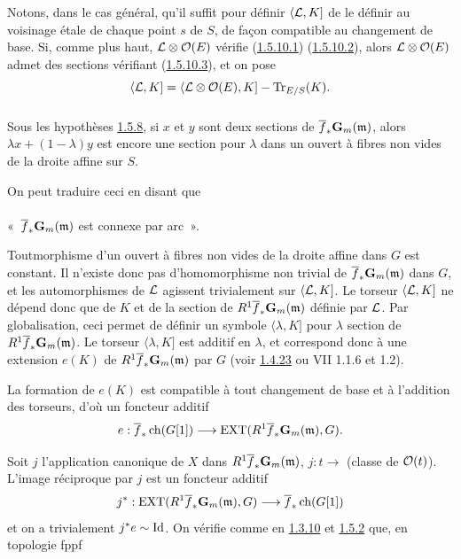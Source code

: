 \documentclass[10pt]{../fichiers-configuration-latex/smfart}
\begin{document}
Notons, dans le cas général, qu'il suffit pour définir
$\langle {\mathcal L},K]$ de le définir au voisinage étale de chaque point $s$
de $S$, de façon compatible au changement de base. Si, comme plus
haut, ${\mathcal L}\otimes {\mathcal O}(E)$ vérifie (\hyperref[XVIII.par1.5.10.1]{1.5.10.1})
(\hyperref[XVIII.par1.5.10.2]{1.5.10.2}), 
alors ${\mathcal L}\otimes {\mathcal O}(E)$ admet des sections vérifiant
(\hyperref[XVIII.par1.5.10.3]{1.5.10.3}), et on pose
$$
\langle {\mathcal L},K]=\langle {\mathcal L}\otimes {\mathcal O}(E), K]-\operatorname{Tr}_{E/S}(K){}.
$$

\subsubsection{}
Sous les hypothèses \hyperref[XVIII.subsubsec1.5.8]{1.5.8}, si $x$ et $y$ sont
deux sections de 
$\overline{f}_{\ast}\mathbf{G}_{m}(\mathfrak{m})$, alors $\lambda x+(1-\lambda)y$ est
encore une section pour $\lambda$ dans un ouvert à fibres non vides de
la droite affine sur $S$.

On peut traduire ceci en disant que 

\paragraph{}
« $\overline{f}_{\ast}\mathbf{G}_{m}(\mathfrak{m})$ est connexe par arc ».

Tout\pageoriginale morphisme d'un ouvert à fibres non vides de la
droite affine dans $G$ est constant. Il n'existe donc pas
d'homomorphisme non trivial de $\overline{f}_{\ast}\mathbf{G}_{m}(\mathfrak{m})$ dans
$G$, et les automorphismes de ${\mathcal L}$ agissent trivialement sur
$\langle {\mathcal L},K]$. Le torseur $\langle {\mathcal L},K]$ ne dépend donc que de
$K$ et de la section de $R^{1}\overline{f}_{\ast}\mathbf{G}_{m}(\mathfrak{m})$ définie
par ${\mathcal L}$. Par globalisation, ceci permet de définir un
symbole $\langle \lambda,K]$ pour $\lambda$ section de
$R^{1}\overline{f}_{\ast}\mathbf{G}_{m}(\mathfrak{m})$. Le torseur $\langle \lambda,K]$ est
additif en $\lambda$, et correspond donc à une extension $e(K)$ de
$R^{1}\overline{f}_{\ast}\mathbf{G}_{m}(\mathfrak{m})$ par $G$ (voir \hyperref[XVIII.prop1.4.23]{1.4.23}
ou  VII 1.1.6 et 1.2).

La formation de $e(K)$ est compatible à tout changement de base et à
l'addition des torseurs, d'où un foncteur additif
$$
e:\overline{f}_{\ast}\operatorname{ch}(G[1])\longrightarrow
\operatorname{EXT}(R^{1}\overline{f}_{\ast}\mathbf{G}_{m}(\mathfrak{m}),G){}.
$$

Soit $j$ l'application canonique de $X$ dans
$R^{1}\overline{f}_{\ast}\mathbf{G}_{m}(\mathfrak{m})$, $j:t\rightarrow$ (classe de
${\mathcal O}(t)$). L'image réciproque par $j$ est un foncteur additif
$$
j^{\ast}:\operatorname{EXT}(R^{1}\overline{f}_{\ast}\mathbf{G}_{m}(\mathfrak{m}),G)\longrightarrow
\overline{f}_{\ast}\operatorname{ch}(G[1])
$$
et on a trivialement $j^{\ast}e\sim \operatorname{Id}$. On vérifie comme en
\hyperref[XVIII.thm1.3.10]{1.3.10} et \hyperref[XVIII.thm1.5.2]{1.5.2} que, en topologie fppf
\end{document}
